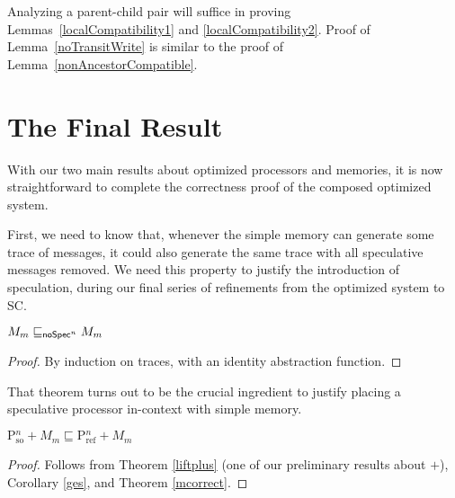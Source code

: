 Analyzing a parent-child pair will suffice in proving
Lemmas~\ref{localCompatibility1} and \ref{localCompatibility2}.  Proof of
Lemma~\ref{noTransitWrite} is similar to the proof of
Lemma~\ref{nonAncestorCompatible}.


\section{The Final Result}\label{sec:finalresult}

With our two main results about optimized processors and memories, it
is now straightforward to complete the correctness proof of the
composed optimized system.

First, we need to know that, whenever the simple memory can generate
some trace of messages, it could also generate the same trace with all
speculative messages removed.  We need this property to justify the
introduction of speculation, during our final series of refinements
from the optimized system to SC.

\begin{theorem}
\label{mcorrect}
$M_m \sqsubseteq_{\mathsf{noSpec}^n} M_m$
\end{theorem}
\begin{proof}
By induction on traces, with an identity abstraction function.
\end{proof}

That theorem turns out to be the crucial ingredient to justify placing
a speculative processor in-context with simple memory.

\begin{theorem}
\label{ocorrect1}
$\text{P$^n_\text{so}$} + M_m \sqsubseteq \text{P$^n_\text{ref}$} + M_m$
\end{theorem}
\begin{proof}
Follows from Theorem \ref{liftplus} (one of our preliminary results
about $+$), Corollary \ref{ges}, and Theorem \ref{mcorrect}.
\end{proof}

